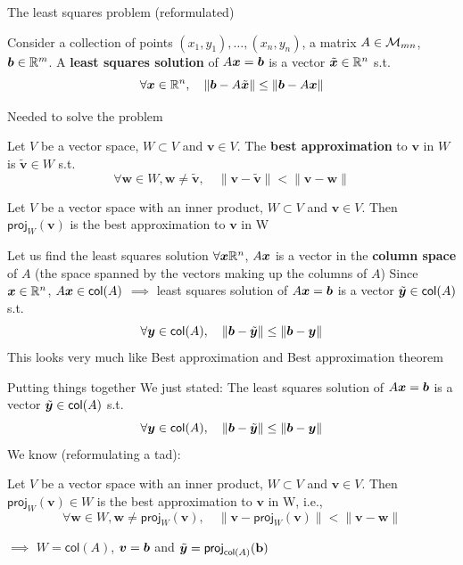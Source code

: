 \documentclass[aspectratio=169]{beamer}\usepackage[]{graphicx}\usepackage[]{xcolor}
\begin{document}
\begin{frame}{The least squares problem (reformulated)}
\begin{definition}
Consider a collection of points $(x_1,y_1),\ldots,(x_n,y_n)$, a matrix $A\in\mathcal{M}_{mn}$, $\bm{b}\in\mathbb{R}^m$. A \textbf{least squares solution} of $A\bm{x}=\bm{b}$ is a vector $\tilde {\bm{x}}\in\mathbb{R}^n$ s.t.
\[
\forall \bm{x}\in\mathbb{R}^n,\quad \|\bm{b}-A\tilde{\bm{x}}\|\leq \|\bm{b}-A\bm{x}\|
\]
\end{definition}
\end{frame}


\begin{frame}{Needed to solve the problem}
\begin{definition}
Let $V$ be a vector space, $W\subset V$ and $\mathbf{v}\in V$. The \textbf{best approximation} to $\mathbf{v}$ in $W$ is $\tilde{\mathbf{v}}\in W$ s.t.
\[
\forall\mathbf{w}\in W, \mathbf{w}\neq\tilde{\mathbf{v}}, \quad
\|\mathbf{v}-\tilde{\mathbf{v}}\| < \|\mathbf{v}-\mathbf{w}\|
\]
\end{definition}
\vfill
\begin{theorem}
Let $V$ be a vector space with an inner product, $W\subset V$ and $\mathbf{v}\in V$. Then $\mathsf{proj}_W(\mathbf{v})$ is the best approximation to $\mathbf{v}$ in W
\end{theorem}
\end{frame}


\begin{frame}{Let us find the least squares solution}
$\forall \bm{x}\mathbb{R}^n$, $A\bm{x}$ is a vector in the \textbf{column space} of $A$ (the space spanned by the vectors making up the columns of $A$)
\vfill
Since $\bm{x}\in\mathbb{R}^n$, $A\bm{x}\in\mathsf{col}(A)$
\vfill
$\implies$ least squares solution of $A\bm{x}=\bm{b}$ is a vector $\tilde{\bm{y}}\in\mathsf{col}(A)$ s.t.
\[
\forall\bm{y}\in\mathsf{col}(A),\quad\|\bm{b}-\tilde{\bm{y}}\|\leq\|\bm{b}-\bm{y}\|
\]
\vfill
This looks very much like Best approximation and Best approximation theorem
\end{frame}

\begin{frame}{Putting things together}
We just stated: The least squares solution of $A\bm{x}=\bm{b}$ is a vector $\tilde{\bm{y}}\in\mathsf{col}(A)$ s.t.
\[
\forall\bm{y}\in\mathsf{col}(A),\quad\|\bm{b}-\tilde{\bm{y}}\|\leq\|\bm{b}-\bm{y}\|
\]
\vfill
We know (reformulating a tad):
\begin{theorem}
Let $V$ be a vector space with an inner product, $W\subset V$ and $\mathbf{v}\in V$. Then $\mathsf{proj}_W(\mathbf{v})\in W$ is the best approximation to $\mathbf{v}$ in W, i.e.,
\[
\forall\mathbf{w}\in W, \mathbf{w}\neq\mathsf{proj}_W(\mathbf{v}), \quad
\|\mathbf{v}-\mathsf{proj}_W(\mathbf{v})\| < \|\mathbf{v}-\mathbf{w}\|
\]
\end{theorem}
\vfill
$\implies$ $W=\mathsf{col}(A)$, $\bm{v}=\bm{b}$ and $\tilde{\bm{y}}=\mathsf{proj}_{\mathsf{col}(A)}(\mathbf{b})$
\end{frame}
\end{document}
